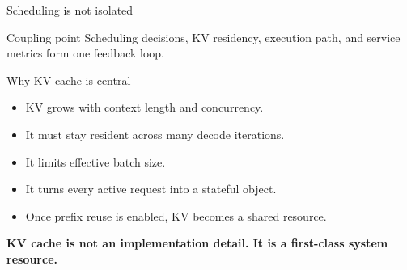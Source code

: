 \documentclass[aspectratio=169,11pt]{beamer}
\newcommand{\term}[1]{\textcolor{HUSTBlue}{\textbf{#1}}}
\begin{document}
\begin{frame}{Scheduling is not isolated}
  \centering
  \vspace{0.35cm}
  \begin{block}{Coupling point}
    Scheduling decisions, KV residency, execution path, and service metrics form one feedback loop.
  \end{block}
\end{frame}

\begin{frame}{Why KV cache is central}
  \begin{itemize}
    \item KV grows with context length and concurrency.
    \item It must stay resident across many decode iterations.
    \item It limits effective batch size.
    \item It turns every active request into a stateful object.
    \item Once prefix reuse is enabled, KV becomes a shared resource.
  \end{itemize}
  \vspace{0.35cm}
  \begin{center}
    \Large\term{KV cache is not an implementation detail. It is a first-class system resource.}
  \end{center}
\end{frame}
\end{document}
